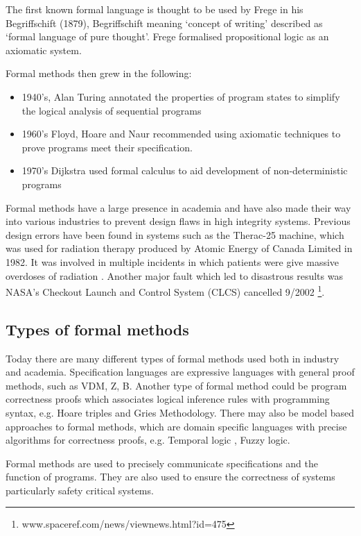 The first known formal language is thought to be used by Frege in his
Begriffschift (1879), Begriffschift meaning `concept of writing' described as
`formal language of pure thought'. Frege formalised propositional logic as an
axiomatic system.

Formal methods then grew in the following:

\begin{itemize}
\item 1940's, Alan Turing annotated the properties of program states to simplify
the logical analysis of sequential programs

\item 1960's Floyd, Hoare and Naur recommended using axiomatic techniques to
prove programs meet their specification.

\item 1970's Dijkstra used formal calculus to aid development of
non-deterministic programs
\end{itemize}

 Formal methods have a large presence in academia and have also made
their way into various industries to prevent design flaws in high integrity
systems. Previous design errors have been found in systems such as the Therac-25
machine, which was used for radiation therapy produced by Atomic Energy of
Canada Limited in 1982. It was involved in multiple incidents in which patients
were give massive overdoses of radiation \cite{baase2003gift}. Another major
fault which led to disastrous results was NASA’s Checkout Launch and Control
System (CLCS) cancelled 9/2002
\footnote{www.spaceref.com/news/viewnews.html?id=475}.

\subsection{Types of formal methods}


Today there are many different types of formal methods used both in industry and
academia. Specification languages are expressive languages with general proof
methods, such as VDM, Z, B. Another type of formal method could be program
correctness proofs which associates logical inference rules with programming
syntax, e.g. Hoare triples and Gries Methodology. There may also be model based
approaches to formal methods, which are domain specific languages with precise
algorithms for correctness proofs, e.g. Temporal logic \cite{uwa}, Fuzzy logic.

Formal methods are used to precisely communicate specifications and the function
of programs. They are also used to ensure the correctness of systems
particularly safety critical systems.

